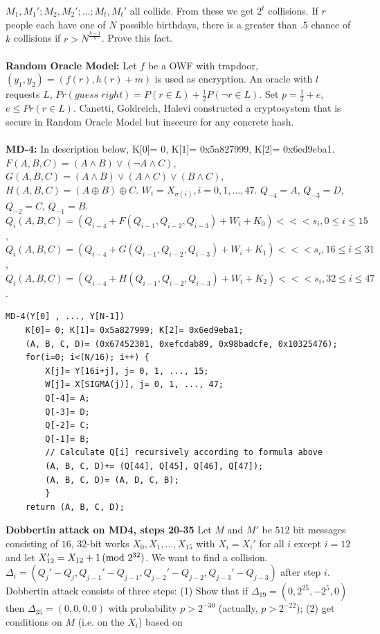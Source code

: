$M_1,M_1'; M_2,M_2'; \ldots ; M_t,M_t'$ all collide.  From these we get  $2^t$ collisions.  
If $r$ people each have one of $N$ possible birthdays, there is a greater than $.5$ chance
of $k$ collisions if
$r > N^{\frac {k-1} k}$.  Prove this fact.
\\
\\
{\bf Random Oracle Model:} 
Let $f$ be a OWF with trapdoor, $(y_1, y_2)= (f(r) , h(r) + m)$ is used as encryption.
An oracle with $l$ requests $L$, $Pr(guess \; right)= P( r \in L) + {\frac 1 2} P( \neg r \in L)$.  
Set $p= {\frac 1 2}+e$,
$e \le Pr(r \in L)$.  
Canetti, Goldreich, Halevi constructed a cryptosystem that is secure in Random Oracle Model but 
insecure for any concrete hash.
\\
\\
{\bf MD-4:}  In description below, K[0]= 0, K[1]= 0x5a827999, K[2]= 0x6ed9eba1.
$F(A,B,C) = (A \wedge B) \vee (\neg A \wedge C)$,
$G(A,B,C) = (A \wedge B) \vee (A \wedge C) \vee (B \wedge C)$,
$H(A,B,C) = (A \oplus B) \oplus C$.  $W_i= X_{\sigma(i)}, i= 0, 1, \ldots, 47$.
$Q_{-4}= A$,
$Q_{-3}= D$,
$Q_{-2}= C$,
$Q_{-1}= B$.
$Q_i(A,B,C)= (Q_{i-4} + F(Q_{i-1}, Q_{i-2}, Q_{i-3}) + W_i + K_0)<<<s_i, 0 \le i \le 15$,
$Q_i(A,B,C)= (Q_{i-4} + G(Q_{i-1}, Q_{i-2}, Q_{i-3}) + W_i + K_1)<<<s_i, 16 \le i \le 31$,
$Q_i(A,B,C)= (Q_{i-4} + H(Q_{i-1}, Q_{i-2}, Q_{i-3}) + W_i + K_2)<<<s_i, 32 \le i \le 47$.
\begin{verbatim}
MD-4(Y[0] , ..., Y[N-1])
    K[0]= 0; K[1]= 0x5a827999; K[2]= 0x6ed9eba1; 
    (A, B, C, D)= (0x67452301, 0xefcdab89, 0x98badcfe, 0x10325476);
    for(i=0; i<(N/16); i++) {
        X[j]= Y[16i+j], j= 0, 1, ..., 15;
        W[j]= X[SIGMA(j)], j= 0, 1, ..., 47;
        Q[-4]= A;
        Q[-3]= D;
        Q[-2]= C;
        Q[-1]= B;
        // Calculate Q[i] recursively according to formula above
        (A, B, C, D)+= (Q[44], Q[45], Q[46], Q[47]);
        (A, B, C, D)= (A, D, C, B);
        }
    return (A, B, C, D);
\end{verbatim}
{\bf Dobbertin attack on MD4, steps 20-35}  
Let $M$ and $M'$ be $512$ bit messages consisting
of $16$, $32$-bit works $X_0 , X_1 , \ldots, X_{15}$ with $X_i=X_i'$ for all $i$ except
$i=12$ and let $X_{12}' = X_{12}+1 \thinspace \textnormal{(mod } 2^{32} \textnormal{)}$.  We want to find a collision.
$\Delta_i= (Q_j'- Q_j, Q_{j-1}'-Q_{j-1}, Q_{j-2}'-Q_{j-2}, Q_{j-3}' - Q_{j-3})$ after
step $i$.  Dobbertin attack consists of three steps: (1) Show that if
$\Delta_{19}= (0, 2^{25}, -2^5,0)$ then $\Delta_{35}= (0, 0, 0, 0)$ with probability
$p> 2^{-30}$ (actually,
$p> 2^{-22}$); (2) get conditions on $M$ (i.e. on the $X_i$) based on
